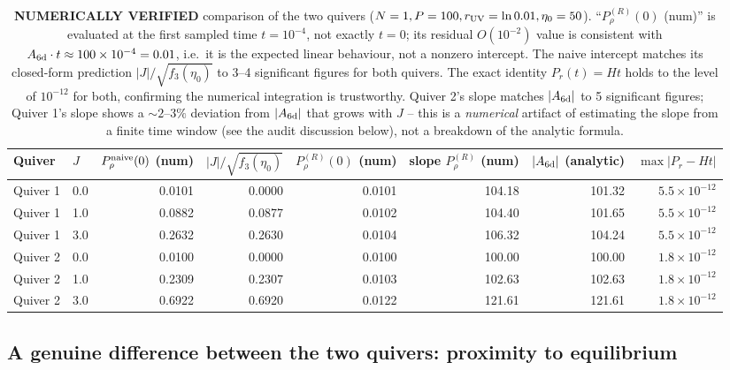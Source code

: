 \documentclass[11pt]{article}
\begin{document}
\begin{table}[H]
\centering
\small
\begin{tabular}{@{}llrrrrrr@{}}
\toprule
Quiver & $J$ & $P_\rho^{\rm naive}(0)$ (num) & $|J|/\sqrt{f_3(\eta_0)}$ & $P_\rho^{(R)}(0)$ (num) & slope $P_\rho^{(R)}$ (num) & $|A_{\rm 6d}|$ (analytic) & $\max|P_r-Ht|$ \\
\midrule
Quiver 1 & 0.0 & 0.0101 & 0.0000 & 0.0101 & 104.18 & 101.32 & $5.5\times10^{-12}$\\
Quiver 1 & 1.0 & 0.0882 & 0.0877 & 0.0102 & 104.40 & 101.65 & $5.5\times10^{-12}$\\
Quiver 1 & 3.0 & 0.2632 & 0.2630 & 0.0104 & 106.32 & 104.24 & $5.5\times10^{-12}$\\
Quiver 2 & 0.0 & 0.0100 & 0.0000 & 0.0100 & 100.00 & 100.00 & $1.8\times10^{-12}$\\
Quiver 2 & 1.0 & 0.2309 & 0.2307 & 0.0103 & 102.63 & 102.63 & $1.8\times10^{-12}$\\
Quiver 2 & 3.0 & 0.6922 & 0.6920 & 0.0122 & 121.61 & 121.61 & $1.8\times10^{-12}$\\
\bottomrule
\end{tabular}
\caption{\textbf{NUMERICALLY VERIFIED} comparison of the two quivers ($N=1,P=100,r_{\rm UV}=\ln0.01,\eta_0=50$). ``$P_\rho^{(R)}(0)$ (num)'' is evaluated at the first sampled time $t=10^{-4}$, not exactly $t=0$; its residual $O(10^{-2})$ value is consistent with $A_{\rm 6d}\cdot t\approx100\times10^{-4}=0.01$, i.e.\ it is the expected linear behaviour, not a nonzero intercept. The naive intercept matches its closed-form prediction $|J|/\sqrt{f_3(\eta_0)}$ to 3--4 significant figures for both quivers. The exact identity $P_r(t)=Ht$ holds to the level of $10^{-12}$ for both, confirming the numerical integration is trustworthy. Quiver 2's slope matches $|A_{\rm 6d}|$ to 5 significant figures; Quiver 1's slope shows a $\sim2$--$3\%$ deviation from $|A_{\rm 6d}|$ that grows with $J$ -- this is a \emph{numerical} artifact of estimating the slope from a finite time window (see the audit discussion below), not a breakdown of the analytic formula.}
\label{tab:quiver-comparison}
\end{table}

\subsection{A genuine difference between the two quivers: proximity to equilibrium}
\label{subsec:quiver-difference}
\end{document}
